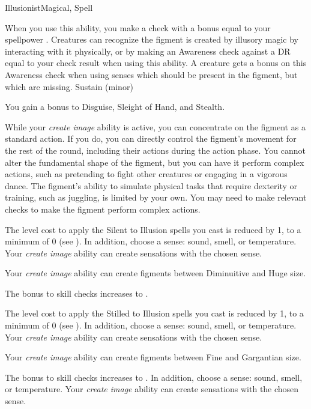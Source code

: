 \begin{feat}{Illusionist}{Magical, Spell}
\begin{ability}
\begin{spelleffects}
                When you use this ability, you make a check with a bonus equal to your spellpower .
                Creatures can recognize the figment is created by illusory magic by interacting with it physically, or by making an Awareness check against a DR equal to your check result when using this ability.
                A creature gets a  bonus on this Awareness check when using senses which should be present in the figment, but which are missing.
                \spelldur Sustain (minor)
            \end{spelleffects}
        \end{ability}

         You gain a  bonus to Disguise, Sleight of Hand, and Stealth.

         While your \textit{create image} ability is active, you can concentrate on the figment as a standard action.
        If you do, you can directly control the figment's movement for the rest of the round, including their actions during the action phase.
        You cannot alter the fundamental shape of the figment, but you can have it perform complex actions, such as pretending to fight other creatures or engaging in a vigorous dance.
        The figment's ability to simulate physical tasks that require dexterity or training, such as juggling, is limited by your own.
        You may need to make relevant checks to make the figment perform complex actions.

         The level cost to apply the Silent  to Illusion spells you cast is reduced by 1, to a minimum of 0 (see ).
        In addition, choose a sense: sound, smell, or temperature.
        Your \textit{create image} ability can create sensations with the chosen sense.

         Your \textit{create image} ability can create figments between Diminuitive and Huge size.

         The bonus to skill checks increases to .

         The level cost to apply the Stilled  to Illusion spells you cast is reduced by 1, to a minimum of 0 (see ).
        In addition, choose a sense: sound, smell, or temperature.
        Your \textit{create image} ability can create sensations with the chosen sense.

         Your \textit{create image} ability can create figments between Fine and Gargantian size.

         The bonus to skill checks increases to .
        In addition, choose a sense: sound, smell, or temperature.
        Your \textit{create image} ability can create sensations with the chosen sense.
    \end{feat}

